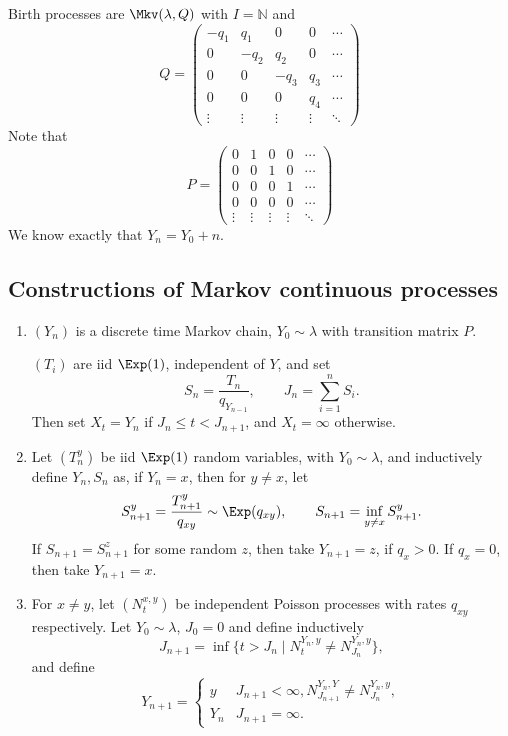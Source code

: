 \documentclass[12pt]{article}
\begin{document}
\begin{exbox}
	Birth processes are $\Mkv(\lambda, Q)$ with $I = \mathbb{N}$ and
\[
Q =
\begin{pmatrix}
	-q_1 & q_1 & 0 & 0 & \cdots \\
	0 & -q_2 & q_2 & 0 & \cdots \\
	0 & 0 & -q_3 & q_3 & \cdots \\
	0 & 0 & 0 & q_4 & \cdots \\
	\vdots & \vdots & \vdots & \vdots & \ddots
\end{pmatrix}
\]
Note that
\[
P =
\begin{pmatrix}
	0 & 1 & 0 & 0 & \cdots \\
	0 & 0 & 1 & 0 & \cdots \\
	0 & 0 & 0 & 1 & \cdots \\
	0 & 0 & 0 & 0 & \cdots \\
	\vdots & \vdots & \vdots & \vdots & \ddots
\end{pmatrix}
\]
We know exactly that $Y_n = Y_0 + n$.
\end{exbox}

\subsection{Constructions of Markov continuous processes}
\label{sub:constructions_of_markov_continuous_processes}

\begin{enumerate}[1.]
	\item $(Y_n)$ is a discrete time Markov chain, $Y_0 \sim \lambda$ with transition matrix $P$.

		$(T_i)$ are iid $\Exp(1)$, independent of $Y$, and set
		\[
		S_n = \frac{T_n}{q_{Y_{n-1}}}, \qquad J_n = \sum_{i = 1}^{n} S_i
		.\]
		Then set $X_t = Y_n$ if $J_n \leq t < J_{n+1}$, and $X_t = \infty$ otherwise.
	\item Let $(T_n^{y})$ be iid $\Exp(1)$ random variables, with $Y_0 \sim \lambda$, and inductively define $Y_n, S_n$ as, if $Y_n = x$, then for $y \neq x$, let
			\[
			S_{n+1}^{y} = \frac{T_{n+1}^{y}}{q_{xy}} \sim \Exp(q_{xy}), \qquad S_{n+1} = \inf_{y \neq x} S_{n+1}^{y}.
			\]
			If $S_{n+1} = S_{n+1}^{z}$ for some random $z$, then take $Y_{n+1} = z$, if $q_x > 0$. If $q_x = 0$, then take $Y_{n+1} = x$.
		\item For $x \neq y$, let $(N_t^{x,y})$ be independent Poisson processes with rates $q_{xy}$ respectively. Let $Y_0 \sim \lambda$, $J_0 = 0$ and define inductively
			\[
				J_{n+1} = \inf \{ t > J_n \mid N_t^{Y_n,y} \neq N_{J_n}^{Y_n,y}\}
			,\]
			and define
			\[
			Y_{n+1}=
			\begin{cases}
				y & J_{n+1} < \infty, N_{J_{n+1}}^{Y_n,Y} \neq N_{J_n}^{Y_n,y}, \\
				Y_n & J_{n+1} = \infty.
			\end{cases}
			\]
\end{enumerate}
\end{document}
